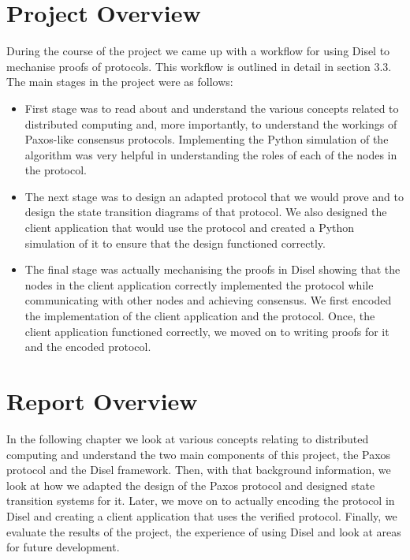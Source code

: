 \vspace{-4mm}
\section{Project Overview}
During the course of the
project we came up with a workflow for using Disel to mechanise proofs of protocols.
This workflow is outlined in detail in section 3.3. The main
stages in the project were as follows:
\begin{itemize}
\itemsep0em
  \item First stage was to read about and understand the various concepts related
    to distributed computing and, more importantly, to understand the workings of
    Paxos-like consensus protocols. Implementing the Python simulation of the
    algorithm was very helpful in understanding the roles of each of the nodes
    in the protocol.

  \item The next stage was to design an adapted protocol that we would prove and
    to design the state transition diagrams of that protocol.
    We also designed the client application that would use the protocol and created
    a Python simulation of it to ensure that the design functioned correctly.

  \item The final stage was actually mechanising the proofs in Disel showing that
    the nodes in the client application correctly implemented the protocol while
    communicating with other nodes and achieving consensus. We first
    encoded the implementation of the client application and the protocol. Once,
    the client application functioned correctly, we moved on to writing proofs
    for it and the encoded protocol.
\end{itemize}

\vspace{-4mm}
\section{Report Overview}
In the following chapter we look at various concepts relating to distributed
computing and understand the two main components of this project, the Paxos
protocol and the Disel framework. Then, with that background information,
we look at how we adapted the design of the Paxos protocol and designed
state transition systems for it. Later,
we move on to actually encoding the protocol in Disel and creating a client
application that uses the verified protocol.
Finally, we evaluate the results of the project, the
experience of using Disel and look at areas for future
development.
